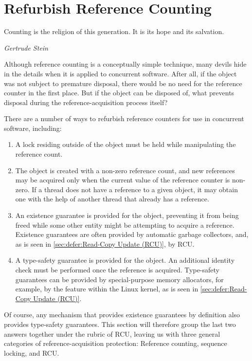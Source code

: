 
\section{Refurbish Reference Counting}
\label{sec:together:Refurbish Reference Counting}
%
\epigraph{Counting is the religion of this generation.  It is its
	  hope and its salvation.}
	 {\emph{Gertrude Stein}}

Although reference counting is a conceptually simple technique,
many devils hide in the details when it is applied to concurrent
software.
After all, if the object was not subject to premature disposal,
there would be no need for the reference counter in the first place.
But if the object can be disposed of, what prevents disposal during
the reference-acquisition process itself?

There are a number of ways to refurbish reference counters for
use in concurrent software, including:

\begin{enumerate}
\item	A lock residing outside of the object must be held while
	manipulating the reference count.
\item	The object is created with a non-zero reference count, and new
	references may be acquired only when the current value of
	the reference counter is non-zero.
	If a thread does not have a reference to a given object,
	it may obtain one with the help of another thread that
	already has a reference.
\item	An existence guarantee is provided for the object, preventing
	it from being freed while some other
	entity might be attempting to acquire a reference.
	Existence guarantees are often provided by automatic
	garbage collectors, and, as is seen in
	\cref{sec:defer:Read-Copy Update (RCU)}, by RCU.
\item	A type-safety guarantee is provided for the object.
	An additional identity check must be performed once
	the reference is acquired.
	Type-safety guarantees can be provided by special-purpose
	memory allocators, for example, by the
	 feature within the Linux kernel,
	as is seen in \cref{sec:defer:Read-Copy Update (RCU)}.
\end{enumerate}

Of course, any mechanism that provides existence guarantees
by definition also provides type-safety guarantees.
This section will therefore group the last two answers together under the
rubric of RCU, leaving us with three general categories of
reference-acquisition protection: Reference counting, sequence
locking, and RCU.

